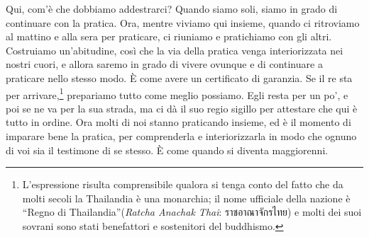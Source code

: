 Qui, com'è che dobbiamo addestrarci? Quando siamo soli, siamo in grado
di continuare con la pratica. Ora, mentre viviamo qui insieme, quando ci
ritroviamo al mattino e alla sera per praticare, ci riuniamo e
pratichiamo con gli altri. Costruiamo un'abitudine, così che la via
della pratica venga interiorizzata nei nostri cuori, e allora saremo in
grado di vivere ovunque e di continuare a praticare nello stesso modo. È
come avere un certificato di garanzia. Se il re sta per
arrivare,\footnote{L'espressione risulta comprensibile qualora si tenga
  conto del fatto che da molti secoli la Thailandia è una monarchia; il
  nome ufficiale della nazione è ``Regno di Thailandia''(\emph{Ratcha
  Anachak Thai}: ราชอาณาจักรไทย) e molti dei suoi sovrani sono stati
  benefattori e sostenitori del buddhismo.} prepariamo tutto come meglio
possiamo. Egli resta per un po', e poi se ne va per la sua strada, ma ci
dà il suo regio sigillo per attestare che qui è tutto in ordine. Ora
molti di noi stanno praticando insieme, ed è il momento di imparare bene
la pratica, per comprenderla e interiorizzarla in modo che ognuno di voi
sia il testimone di se stesso. È come quando si diventa maggiorenni.

